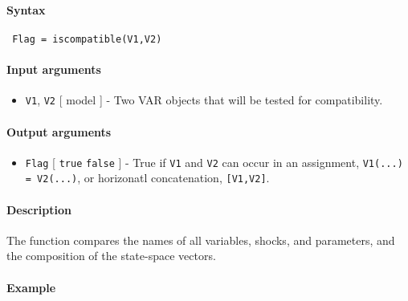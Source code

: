 


	\paragraph{Syntax}
 
 \begin{verbatim}
 Flag = iscompatible(V1,V2)
 \end{verbatim}
 
 \paragraph{Input arguments}
 
 \begin{itemize}
 \item
   \texttt{V1}, \texttt{V2} {[} model {]} - Two VAR objects that will be
   tested for compatibility.
 \end{itemize}
 
 \paragraph{Output arguments}
 
 \begin{itemize}
 \item
   \texttt{Flag} {[} \texttt{true} \textbar{} \texttt{false} {]} - True
   if \texttt{V1} and \texttt{V2} can occur in an assignment,
   \texttt{V1(...) = V2(...)}, or horizonatl concatenation,
   \texttt{{[}V1,V2{]}}.
 \end{itemize}
 
 \paragraph{Description}
 
 The function compares the names of all variables, shocks, and
 parameters, and the composition of the state-space vectors.
 
 \paragraph{Example}


